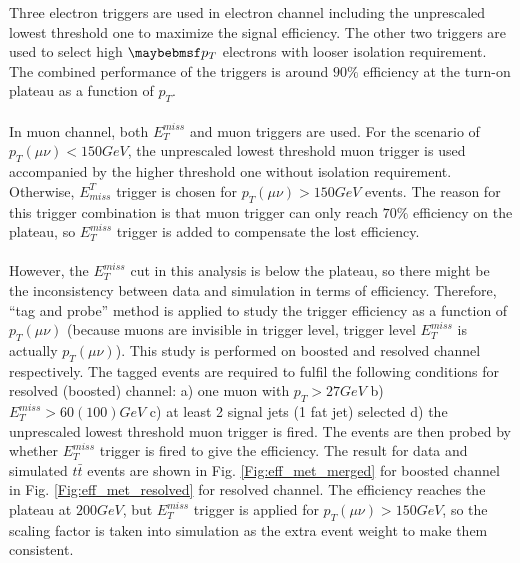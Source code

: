 \noindent
Three electron triggers are used in electron channel including the unprescaled lowest threshold one to maximize the signal efficiency. The other two triggers are used to select high $\p_{T}$ electrons with looser isolation requirement. The combined performance of the triggers is around $90\%$ efficiency at the turn-on plateau as a function of $p_{T}$.
\\
\\In muon channel, both $E_{T}^{miss}$ and muon triggers are used. For the scenario of $p_{T}(\mu\nu)<150GeV$, the unprescaled lowest threshold muon trigger is used accompanied by the higher threshold one without isolation requirement. Otherwise, $E^{T}_{miss}$ trigger is chosen for $p_{T}(\mu\nu)>150GeV$ events. The reason for this trigger combination is that muon trigger can only reach $70\%$ efficiency on the plateau, so $E^{miss}_{T}$ trigger is added to compensate the lost efficiency. 
\\
\\However, the $E^{miss}_{T}$ cut in this analysis is below the plateau, so there might be the inconsistency between data and simulation in terms of efficiency. Therefore, ``tag and probe'' method is applied to study the trigger efficiency as a function of $p_{T}(\mu\nu)$ (because muons are invisible in trigger level, trigger level $E_{T}^{miss}$ is actually $p_{T}(\mu\nu)$). This study is performed on boosted and resolved channel respectively. The tagged events are required to fulfil the following conditions for resolved (boosted) channel: a) one muon with $p_{T}>27GeV$ b) $E^{miss}_{T}>60(100)GeV$ c) at least 2 signal jets (1 fat jet) selected d) the unprescaled lowest threshold muon trigger is fired. The events are then probed by whether $E^{miss}_{T}$ trigger is fired to give the efficiency. The result for data and simulated $t\bar{t}$ events are shown in Fig. \ref{Fig:eff_met_merged} for boosted channel  in Fig. \ref{Fig:eff_met_resolved} for resolved channel. The efficiency reaches the plateau at $200GeV$, but $E^{miss}_{T}$ trigger is applied for $p_{T}(\mu\nu)>150GeV$, so the scaling factor is taken into simulation as the extra event weight to make them consistent. 
